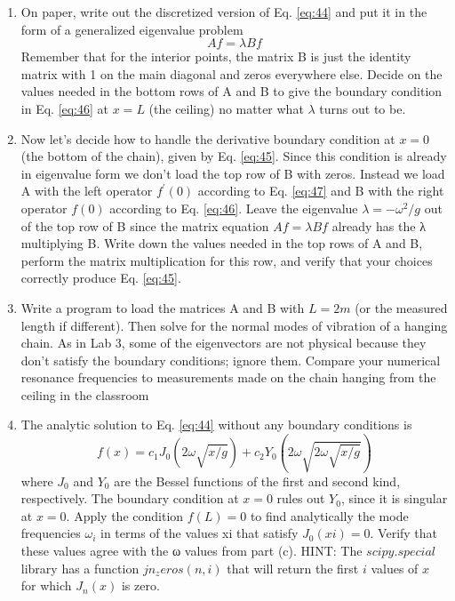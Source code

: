 \begin{problem} \label{P4.2}
				\begin{enumerate}[label=(\alph*)]
			\item	On paper, write out the discretized version of Eq. \eqref{eq:44} and put it in
the form of a generalized eigenvalue problem
\begin{equation}\label{eq:48}
		Af = \lambda B f
				\end{equation}
					Remember that for the interior points, the matrix B is just the identity
matrix with 1 on the main diagonal and zeros everywhere else. Decide on the values needed in the bottom rows of A and B to give the
boundary condition in Eq. \eqref{eq:46} at $x = L$ (the ceiling) no matter what
$\lambda$ turns out to be.
\item Now let\rq s decide how to handle the derivative boundary condition at
$x = 0$ (the bottom of the chain), given by Eq. \eqref{eq:45}. Since this condition
is already in eigenvalue form we don\rq t load the top row of B with zeros.
Instead we load A with the left operator $f^\prime (0)$ according to Eq. \eqref{eq:47}
and B with the right operator $f(0)$  according to Eq. \eqref{eq:46}. Leave the
eigenvalue $ \lambda = − \omega ^ 2
/g$ out of the top row of B since the matrix equation
$Af = \lambda Bf$ already has the λ multiplying B. Write down the values
needed in the top rows of A and B, perform the matrix multiplication
for this row, and verify that your choices correctly produce Eq. \eqref{eq:45}.
\item Write a program to load the matrices A and B with $L = 2 m$ (or the measured length if different). Then solve for the normal modes of vibration
of a hanging chain. As in Lab 3, some of the eigenvectors are not physical because they don\rq t satisfy the boundary conditions; ignore them.
Compare your numerical resonance frequencies to measurements
made on the chain hanging from the ceiling in the classroom
\item The analytic solution to Eq. \eqref{eq:44} without any boundary conditions is
\begin{equation*}
		f(x) = c_1J_0(2\omega \sqrt{x / g}) + c_2 Y_0(2\omega \sqrt{2\omega \sqrt{x / g}})
				\end{equation*}
				where $J_0$ and $Y_0$ are the Bessel functions of the first and second kind,
respectively. The boundary condition at $x = 0$ rules out $Y_0$, since it is
singular at $x = 0$. Apply the condition $f(L) = 0$ to find analytically the
mode frequencies $ \omega_i$
in terms of the values xi that satisfy $J_0(xi) = 0$.
Verify that these values agree with the ω values from part (c).
HINT: The $scipy.special$ library has a function $jn_zeros(n,i)$
that will return the first $i$ values of $x$ for which $J_n(x)$ is zero.
				\end{enumerate}
			\end{problem}		

